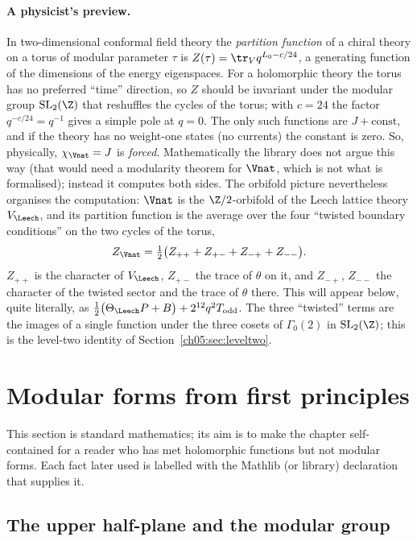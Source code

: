 \paragraph{A physicist's preview.}
In two-dimensional conformal field theory the \emph{partition function} of a chiral theory on a
torus of modular parameter $\tau$ is $Z(\tau) = \tr_V q^{L_0 - c/24}$, a generating function of
the dimensions of the energy eigenspaces. For a holomorphic theory the torus has no preferred
``time'' direction, so $Z$ should be invariant under the modular group $\chfiveSL$ that reshuffles
the cycles of the torus; with $c = 24$ the factor $q^{-c/24} = q^{-1}$ gives a simple pole at
$q = 0$. The only such functions are $J + \text{const}$, and if the theory has no weight-one states
(no currents) the constant is zero. So, physically, $\chi_{\Vnat} = J$ is \emph{forced}.
Mathematically the library does not argue this way (that would need a modularity theorem for
$\Vnat$, which is not what is formalised); instead it computes both sides. The orbifold picture
nevertheless organises the computation: $\Vnat$ is the $\Z/2$-orbifold of the Leech lattice theory
$V_\Leech$, and its partition function is the average over the four ``twisted boundary
conditions'' on the two cycles of the torus,
\begin{equation*}
  Z_{\Vnat} = \tfrac12\bigl(Z_{++} + Z_{+-} + Z_{-+} + Z_{--}\bigr).
\end{equation*}
$Z_{++}$ is the character of $V_\Leech$, $Z_{+-}$ the trace of $\theta$ on it, and $Z_{-+}$,
$Z_{--}$ the character of the twisted sector and the trace of $\theta$ there. This will appear
below, quite literally, as $\tfrac12\bigl(\Theta_\Leech P + B\bigr) + 2^{12}q^2T_{\mathrm{odd}}$.
The three ``twisted'' terms are the images of a single function under the three cosets of
$\Gamma_0(2)$ in $\chfiveSL$; this is the level-two identity of Section~\ref{ch05:sec:leveltwo}.

\section{Modular forms from first principles}\label{ch05:sec:modular}

This section is standard mathematics; its aim is to make the chapter self-contained for a reader
who has met holomorphic functions but not modular forms. Each fact later used is labelled with the
Mathlib (or library) declaration that supplies it.

\subsection{The upper half-plane and the modular group}

